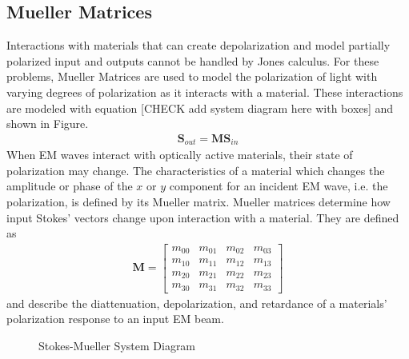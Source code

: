 \subsection{Mueller Matrices}
Interactions with materials that can create depolarization and model partially polarized input and outputs cannot be handled by Jones calculus.  For these problems, Mueller Matrices are used to model the polarization of light with varying degrees of polarization as it interacts with a material.  These interactions are modeled with equation [CHECK add system diagram here with boxes] and shown in Figure.
\begin{align}
    \mathbf{S}_{out} = \mathbf{M}\mathbf{S}_{in}
\end{align}
%
When EM waves interact with optically active materials, their state of polarization may change.  The characteristics of a material which changes the amplitude or phase of the $x$ or $y$ component for an incident EM wave, i.e. the  polarization, is defined by its Mueller matrix.  Mueller matrices determine how input Stokes' vectors change upon interaction with a material. They are defined as
%
\begin{align}
    \mathbf{M} =
    \begin{bmatrix}
        m_{00} & m_{01} & m_{02} & m_{03} \\
        m_{10} & m_{11} & m_{12} & m_{13} \\
        m_{20} & m_{21} & m_{22} & m_{23} \\
        m_{30} & m_{31} & m_{32} & m_{33}
    \end{bmatrix}
\end{align}
%
and describe the diattenuation, depolarization, and retardance of a materials' polarization response to an input EM beam.
\begin{figure}
    \begin{center}
    \end{center}
    \caption{Stokes-Mueller System Diagram}
    \label{fig:polarization}
\end{figure}
